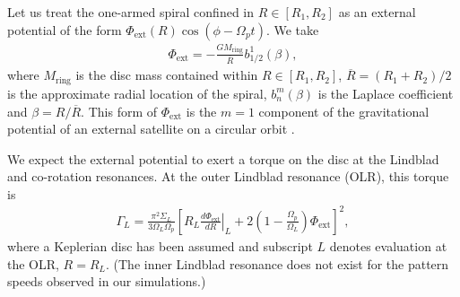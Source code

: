 Let us treat the one-armed spiral confined in $R\in[R_1,R_2]$ as an  
external potential of the form $\Phi_\mathrm{ext}(R)\cos{\left(\phi -
    \Omega_pt\right)}$. We take 
\begin{align} 
  \Phi_\mathrm{ext}
  =-\frac{GM_\mathrm{ring}}{\overline{R}}b^{1}_{1/2}(\beta),   
\end{align}
where $M_\mathrm{ring}$ is the disc mass contained within
$R\in[R_1,R_2]$, $\overline{R} = (R_1+R_2)/2$ is the approximate radial
location of the spiral, $b_{n}^m(\beta)$ is the Laplace coefficient
and $\beta = R/\overline{R}$. This form of
$\Phi_\mathrm{ext}$ is the $m=1$ component of the gravitational
potential of an external satellite on a circular orbit
\citep{goldreich79}.    


We expect the external potential to exert a torque on the disc at the
Lindblad and co-rotation resonances. At the outer Lindblad resonance
(OLR), this torque is 
\begin{align}
  \Gamma_L =
  \frac{\pi^2\Sigma_L}{3\Omega_L\Omega_p}
  \left[\left.R_L\frac{d\Phi_\mathrm{ext}}{dR}\right|_L + 2\left(1 -
      \frac{\Omega_p}{\Omega_L}\right)\Phi_\mathrm{ext}\right]^2, 
\end{align}   
where a Keplerian disc has been assumed and subscript $L$ denotes
evaluation at the OLR, $R=R_L$. (The inner Lindblad resonance does not
exist for the pattern speeds observed in our simulations.) 

